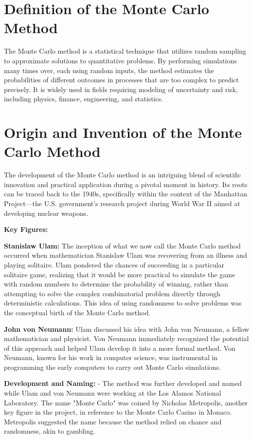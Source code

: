 \documentclass{article}
\begin{document}
\newpage

\section{Definition of the Monte Carlo Method}
The Monte Carlo method is a statistical technique that utilizes random sampling to approximate solutions to quantitative problems. By performing simulations many times over, each using random inputs, the method estimates the probabilities of different outcomes in processes that are too complex to predict precisely. It is widely used in fields requiring modeling of uncertainty and risk, including physics, finance, engineering, and statistics.

\section{Origin and Invention of the Monte Carlo Method}
The development of the Monte Carlo method is an intriguing blend of scientific innovation and practical application during a pivotal moment in history. Its roots can be traced back to the 1940s, specifically within the context of the Manhattan Project—the U.S. government's research project during World War II aimed at developing nuclear weapons.

\vspace{1em}
\textbf{Key Figures:}
\vspace{1em}

\textbf{Stanislaw Ulam:} The inception of what we now call the Monte Carlo method occurred when mathematician Stanislaw Ulam was recovering from an illness and playing solitaire. Ulam pondered the chances of succeeding in a particular solitaire game, realizing that it would be more practical to simulate the game with random numbers to determine the probability of winning, rather than attempting to solve the complex combinatorial problem directly through deterministic calculations. This idea of using randomness to solve problems was the conceptual birth of the Monte Carlo method.

\textbf{John von Neumann:} Ulam discussed his idea with John von Neumann, a fellow mathematician and physicist. Von Neumann immediately recognized the potential of this approach and helped Ulam develop it into a more formal method. Von Neumann, known for his work in computer science, was instrumental in programming the early computers to carry out Monte Carlo simulations.

\textbf{Development and Naming:}
- The method was further developed and named while Ulam and von Neumann were working at the Los Alamos National Laboratory. The name "Monte Carlo" was coined by Nicholas Metropolis, another key figure in the project, in reference to the Monte Carlo Casino in Monaco. Metropolis suggested the name because the method relied on chance and randomness, akin to gambling.
\end{document}
